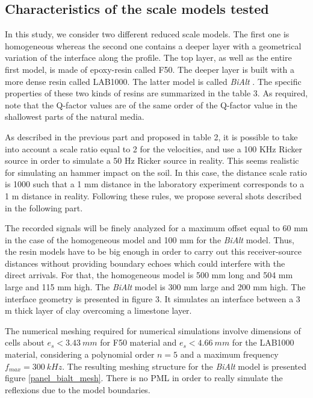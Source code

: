 \documentclass[manuscript,revised]{geophysics}
\newcommand{\bialt}{\textit{BiAlt} }
\begin{document}
\subsection{Characteristics of the scale models tested}

\noindent In this study, we consider two different reduced scale models. The first one is homogeneous whereas the second one contains a deeper layer with a geometrical variation of the interface along the profile. The top layer, as well as the entire first model, is made of epoxy-resin called F50. The deeper layer is built with a more dense resin called LAB1000. The latter model is called \bialt. The specific properties of these two kinds of resins are summarized in the table 3. As required, note that the Q-factor values are of the same order of the Q-factor value in the shallowest parts of the natural media.

\noindent As described in the previous part and proposed in table 2, it is possible to take into account a scale ratio equal to 2 for the velocities, and use a 100 KHz Ricker source in order to simulate a 50 Hz Ricker source in reality. This seems realistic for simulating an hammer impact on the soil. In this case, the distance scale ratio is 1000 such that a 1 mm distance in the laboratory experiment corresponds to a 1 m distance in reality. Following these rules, we propose several shots described in the following part. 

\noindent The recorded signals will be finely analyzed for a maximum offset equal to 60 mm in the case of the homogeneous model and 100 mm for the \bialt model. Thus, the resin models have to be big enough in order to carry out this receiver-source distances without providing boundary echoes which could interfere with the direct arrivals. For that, the homogeneous model is 500 mm long and 504 mm large and 115 mm high. The \bialt model is 300 mm large and 200 mm high. The interface geometry is presented in figure 3. It simulates an interface between a 3 m thick layer of clay overcoming a limestone layer.

\noindent The numerical meshing required for numerical simulations involve dimensions of cells about $e_{s}<3.43\ mm$ for F50 material and $e_{s}<4.66\ mm$ for the LAB1000 material, considering a polynomial order $n=5$ and a maximum frequency $f_{max}=300\ kHz$. The resulting meshing structure for the \bialt model is presented figure \ref{panel_bialt_mesh}.
There is no PML in order to really simulate the reflexions due to the model boundaries.
\end{document}
